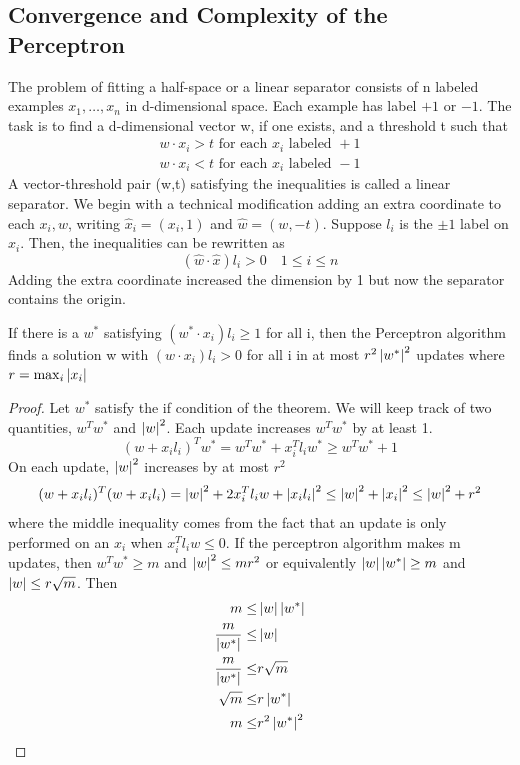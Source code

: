 \subsection{Convergence and Complexity of the Perceptron}
The problem of fitting a half-space or a linear separator consists of n labeled examples $x_{1}, \ldots,x_{n}$ in d-dimensional space. Each example has label $+1$ or $-1$. The task is to find a d-dimensional vector w, if one exists, and a threshold t such that
\begin{align*}
    w\cdot x_i > t \text{ for each } x_i \text{ labeled }+1\\
    w\cdot x_i < t \text{ for each } x_i \text{ labeled }-1
\end{align*}
A vector-threshold pair (w,t) satisfying the inequalities is called a linear separator. We begin with a technical modification adding an extra coordinate to each $x_i, w$, writing $\hat{x}_i=(x_i,1)$ and $\hat{w} =(w,-t)$. Suppose $l_i$ is the $\pm 1$ label on $x_i$. Then, the inequalities can be rewritten as 
\[ 
    (\hat{w} \cdot \hat{x})l_i > 0 \quad 1 \leq i \leq n 
\]
Adding the extra coordinate increased the dimension by 1 but now the separator contains the origin.
\begin{theorem}
    If there is a $w^*$ satisfying $(w^*\cdot x_i)l_i\geq 1$ for all i, then the Perceptron algorithm finds a solution w with $(w\cdot x_i)l_i >0$ for all i in at most $r^2\left\lvert w^*\right\rvert^2$ updates where $r = \max_{i}{\left\lvert x_i\right\rvert}$
    \begin{proof}
        Let $w^*$ satisfy the if condition of the theorem. We will keep track of two quantities, $w^Tw^*$ and $\left\lvert w\right\rvert^2$. Each update increases $w^Tw^*$ by at least 1.
        \[ 
            (w+x_il_i)^Tw^* = w^Tw^* + x_i^Tl_iw^* \geq w^Tw^*+1
        \]
        On each update, $\left\lvert w\right\rvert^2$ increases by at most $r^2$
        \[ 
            (w+x_il_i)^T(w+x_il_i) =\left\lvert w\right\rvert^2+ 2x_i^Tl_iw+\left\lvert x_il_i\right\rvert^2 \leq \left\lvert w\right\rvert^2 +\left\lvert x_i\right\rvert^2 \leq \left\lvert w\right\rvert^2+r^2 
        \]
        where the middle inequality comes from the fact that an update is only performed on an $x_i$ when $x_i^Tl_iw\leq 0$. If the perceptron algorithm makes m updates, then $w^Tw^* \geq m$ and $\left\lvert w\right\rvert^2 \leq mr^2$ or equivalently $\left\lvert w\right\rvert\left\lvert w^*\right\rvert\geq m$ and $\left\lvert w\right\rvert \leq r \sqrt{m}$. Then
        \begin{align*}
            m \leq& \left\lvert w\right\rvert\left\lvert w^*\right\rvert \\
            \frac{m}{\left\lvert w^*\right\rvert} \leq& \left\lvert w\right\rvert\\
            \frac{m}{\left\lvert w^*\right\rvert} \leq & r \sqrt{m} \\
            \sqrt{m} \leq & r\left\lvert w^*\right\rvert\\
            m \leq & r^2\left\lvert w^*\right\rvert^2
        \end{align*}
    \end{proof}
\end{theorem}

